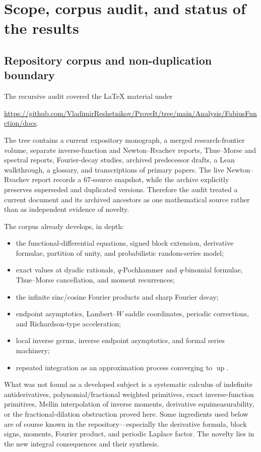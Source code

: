 \documentclass[11pt]{article}
\theoremstyle{definition}
\theoremstyle{remark}
\DeclareMathOperator{\upf}{up}
\begin{document}
\tableofcontents
\newpage

\section{Scope, corpus audit, and status of the results}

\subsection{Repository corpus and non-duplication boundary}

The recursive audit covered the LaTeX material under
\begin{center}
\url{https://github.com/VladimirReshetnikov/ProveIt/tree/main/Analysis/FabiusFunction/docs}.
\end{center}
The tree contains a current expository monograph, a merged research-frontier volume,
separate inverse-function and Newton--Rvachev reports, Thue--Morse and spectral reports,
Fourier-decay studies, archived predecessor drafts, a Lean walkthrough, a glossary,
and transcriptions of primary papers.  The live Newton--Rvachev report records a
67-source snapshot, while the archive explicitly preserves superseded and duplicated
versions.  Therefore the audit treated a current document and its archived ancestors as
one mathematical source rather than as independent evidence of novelty.

The corpus already develops, in depth:
\begin{itemize}
  \item the functional-differential equations, signed block extension, derivative
        formulae, partition of unity, and probabilistic random-series model;
  \item exact values at dyadic rationals, \(q\)-Pochhammer and \(q\)-binomial formulae,
        Thue--Morse cancellation, and moment recurrences;
  \item the infinite sinc/cosine Fourier products and sharp Fourier decay;
  \item endpoint asymptotics, Lambert--\(W\) saddle coordinates, periodic corrections,
        and Richardson-type acceleration;
  \item local inverse germs, inverse endpoint asymptotics, and formal series machinery;
  \item repeated integration as an approximation process converging to \(\upf\).
\end{itemize}

What was not found as a developed subject is a systematic calculus of indefinite
antiderivatives, polynomial/fractional weighted primitives, exact inverse-function
primitives, Mellin interpolation of inverse moments, derivative equimeasurability,
or the fractional-dilation obstruction proved here.  Some ingredients used below are
of course known in the repository---especially the derivative formula, block signs,
moments, Fourier product, and periodic Laplace factor.  The novelty lies in the new
integral consequences and their synthesis.
\end{document}

